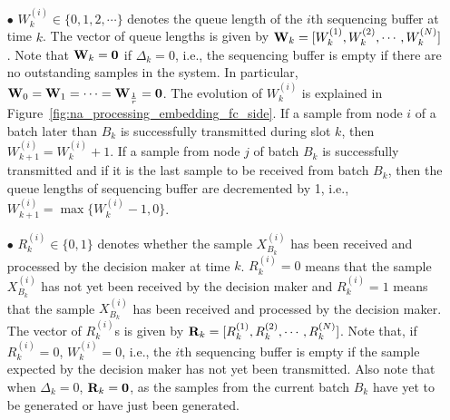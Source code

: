 \documentclass[acmtosn]{acmtrans2m}
\begin{document}
\begin{itemize}
\item[$\bullet$] $W_k^{(i)} \in \{0,1,2,\cdots\}$ denotes the queue 
     length of the $i$th sequencing buffer at time $k$. The vector of 
     queue lengths is given by ${\bf W}_k = [W_k^{(1)}, W_k^{(2)}, 
     \cdots, W_k^{(N)}]$. Note that ${\bf W}_k = {\bf 0}$ if $\Delta_k 
     = 0$, i.e., the sequencing buffer is empty if there are no 
     outstanding samples in the system. In particular, ${\bf W}_0 = 
     {\bf W}_1 = \cdots = {\bf W}_{\frac{1}{r}} = {\bf 0}$. The 
     evolution of $W_k^{(i)}$ is explained in 
     Figure~\ref{fig:na_processing_embedding_fc_side}. If a sample from
     node $i$ of a batch later than $B_k$ is successfully transmitted
     during slot $k$, then $W_{k+1}^{(i)} = W_k^{(i)}+1$. If a sample from
     node $j$ of batch $B_k$ is successfully transmitted and if it is 
     the last sample to be received from batch $B_k$, then the queue
     lengths of sequencing buffer are decremented by 1, i.e.,
     $W_{k+1}^{(i)} = \max\{W_k^{(i)}-1,0\}$.   
     
\item[$\bullet$] $R_k^{(i)} \in \{0,1\}$ denotes whether the sample 
     $X_{B_k}^{(i)}$ has been received and processed by the decision 
     maker at time $k$. $R_k^{(i)} = 0$ means that the sample 
     $X_{B_k}^{(i)}$ has not yet been received by the decision maker 
     and $R_k^{(i)} = 1$ means that the sample $X_{B_k}^{(i)}$ has been 
     received and processed by the decision maker. The vector of 
     $R_k^{(i)}$s is given by ${\bf R}_k = [R_k^{(1)}, R_k^{(2)}, 
     \cdots, R_k^{(N)}]$. Note that, if $R_k^{(i)} = 0$, ${W}_k^{(i)} 
     = 0$, i.e., the $i$th sequencing buffer is empty if the sample 
     expected by the decision maker has not yet been transmitted. Also 
     note that when $\Delta_k = 0$, ${\bf R}_k = {\bf 0}$, as the 
     samples from the current batch $B_k$ have yet to be generated or 
     have just been generated.        
\end{itemize}
\end{document}
